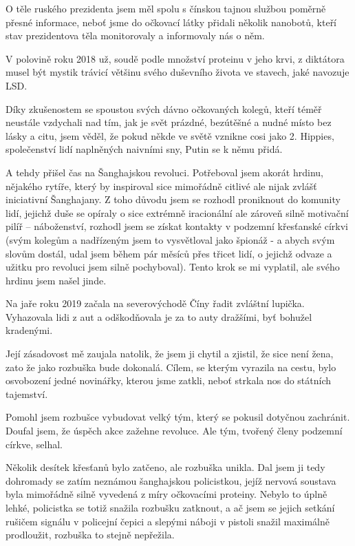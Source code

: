 {O těle ruského prezidenta jsem měl spolu s čínskou tajnou službou poměrně přesné informace, neboť jsme do očkovací látky přidali několik nanobotů, kteří stav prezidentova těla monitorovaly a informovaly nás o něm. 

V polovině roku 2018 už, soudě podle množství proteinu v jeho krvi, z diktátora musel být mystik trávicí většinu svého duševního života ve stavech, jaké navozuje LSD.

Díky zkušenostem se spoustou svých dávno očkovaných kolegů, kteří téměř neustále vzdychali nad tím, jak je svět prázdné, bezútěšné a nudné místo bez lásky a citu, jsem věděl, že pokud někde ve světě vznikne cosi jako 2. Hippies, společenství lidí naplněných naivními sny, Putin se k němu přidá. 

A tehdy přišel čas na Šanghajskou revoluci. Potřeboval jsem akorát hrdinu, nějakého rytíře, který by inspiroval sice mimořádně citlivé ale nijak zvlášť iniciativní Šanghajany. Z toho důvodu jsem se rozhodl proniknout do komunity lidí, jejichž duše se opíraly o sice extrémně iracionální ale zároveň silně motivační pilíř – náboženství, rozhodl jsem se získat kontakty v podzemní křesťanské církvi (svým kolegům a nadřízeným jsem to vysvětloval jako špionáž  - a abych svým slovům dostál, udal jsem během pár měsíců přes třicet lidí, o jejichž odvaze a užitku pro revoluci jsem silně pochyboval). Tento krok se mi vyplatil, ale svého hrdinu jsem našel jinde. 

Na jaře roku 2019 začala na severovýchodě Číny řadit zvláštní lupička. Vyhazovala lidi z aut a odškodňovala je za to auty dražšími, byť bohužel kradenými. 

Její zásadovost mě zaujala natolik, že jsem ji chytil a zjistil, že sice není žena, zato že jako rozbuška bude dokonalá. Cílem, se kterým vyrazila na cestu, bylo osvobození jedné novinářky, kterou jsme zatkli, neboť strkala nos do státních tajemství.

Pomohl jsem rozbušce vybudovat velký tým, který se pokusil dotyčnou zachránit. Doufal jsem, že úspěch akce zažehne revoluce. Ale tým, tvořený členy podzemní církve, selhal.

Několik desítek křesťanů bylo zatčeno, ale rozbuška unikla. Dal jsem ji tedy dohromady se zatím neznámou šanghajskou policistkou, jejíž nervová soustava byla mimořádně silně vyvedená z míry očkovacími proteiny. Nebylo to úplně lehké, policistka se totiž snažila rozbušku zatknout, a ač jsem se jejich setkání rušičem signálu v policejní čepici a slepými náboji v pistoli snažil maximálně prodloužit, rozbuška to stejně nepřežila.

}
